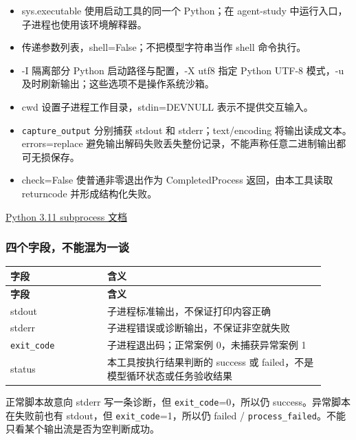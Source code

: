 \documentclass[UTF8,zihao=-4,fontset=fandol]{ctexart}
\begin{document}
\begin{itemize}
\item sys.executable 使用启动工具的同一个 Python；在 agent-study 中运行入口，子进程也使用该环境解释器。
\item 传递参数列表，shell=False；不把模型字符串当作 shell 命令执行。
\item -I 隔离部分 Python 启动路径与配置，-X utf8 指定 Python UTF-8 模式，-u 及时刷新输出；这些选项不是操作系统沙箱。
\item cwd 设置子进程工作目录，stdin=DEVNULL 表示不提供交互输入。
\item \nolinkurl{capture_output} 分别捕获 stdout 和 stderr；text/encoding 将输出读成文本。errors=replace 避免输出解码失败丢失整份记录，不能声称任意二进制输出都可无损保存。
\item check=False 使普通非零退出作为 CompletedProcess 返回，由本工具读取 returncode 并形成结构化失败。
\end{itemize}

\href{https://docs.python.org/3.11/library/subprocess.html}{Python 3.11 subprocess 文档}

\subsubsection{四个字段，不能混为一谈}

{\small\setlength{\tabcolsep}{4pt}
\renewcommand{\arraystretch}{1.25}
\begin{longtable}{>{\raggedright\arraybackslash}p{0.28\linewidth}>{\raggedright\arraybackslash}p{0.63\linewidth}}
\toprule
\textbf{字段} & \textbf{含义} \\
\midrule\endfirsthead
\toprule
\textbf{字段} & \textbf{含义} \\
\midrule\endhead
\bottomrule\endfoot
stdout & 子进程标准输出，不保证打印内容正确 \\
stderr & 子进程错误或诊断输出，不保证非空就失败 \\
\nolinkurl{exit_code} & 子进程退出码；正常案例 0，未捕获异常案例 1 \\
status & 本工具按执行结果判断的 success 或 failed，不是模型循环状态或任务验收结果 \\
\end{longtable}}

正常脚本故意向 stderr 写一条诊断，但 \nolinkurl{exit_code}=0，所以仍 success。异常脚本在失败前也有 stdout，但 \nolinkurl{exit_code}=1，所以仍 failed / \nolinkurl{process_failed}。不能只看某个输出流是否为空判断成功。
\end{document}
